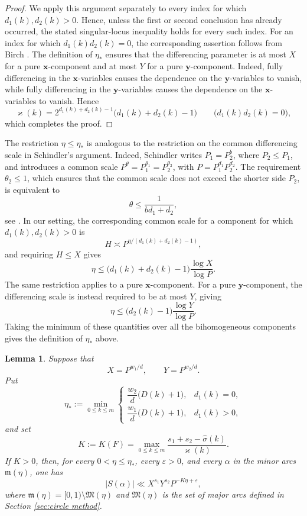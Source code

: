 \documentclass[12pt,reqno]{amsart}
\newtheorem{lemma}[theorem]{Lemma}
\theoremstyle{definition}
\theoremstyle{remark}
\numberwithin{equation}{section}
\def\bfx{{\mathbf x}}
\def\bfy{{\mathbf y}}
\def\grm{{\mathfrak m}}\def\grM{{\mathfrak M}}
\def\a{{\alpha}} \def\bfalp{{\boldsymbol \alpha}} \def\atil{{\widetilde \alpha}}
\def\eps{\varepsilon}
\begin{document}
\begin{proof}
    We apply this argument separately to every index for which
    $d_1(k),d_2(k)>0$. Hence, unless the first or second conclusion has
    already occurred, the stated singular-locus inequality holds for every
    such index. For an index for which $d_1(k)d_2(k)=0$, the corresponding
    assertion follows from Birch \cite[Lemma 2.5]{Birch1962}.  The
    definition of $\eta_*$ ensures that the differencing parameter is at
    most $X$ for a pure $\bfx$-component and at most $Y$ for a pure
    $\bfy$-component.
    Indeed, fully differencing in the $\bfx$-variables causes the
    dependence on the $\bfy$-variables to vanish, while fully
    differencing in the $\bfy$-variables causes the dependence on the
    $\bfx$-variables to vanish. Hence
    \[
        \varkappa(k)
        =2^{d_1(k)+d_2(k)-1}
        \bigl(d_1(k)+d_2(k)-1\bigr)
        \qquad\bigl(d_1(k)d_2(k)=0\bigr),
    \]
    which completes the proof.
\end{proof}

The restriction $\eta\leq\eta_*$ is analogous to the restriction on the
common differencing scale in Schindler's argument.  Indeed, Schindler writes
$P_1=P_2^b$, where $P_2\leq P_1$, and introduces a common scale
$P^\theta=P_1^{\theta_1}=P_2^{\theta_2}$, with
$P=P_1^{d_1}P_2^{d_2}$.  The requirement $\theta_2\leq1$, which ensures
that the common scale does not exceed the shorter side $P_2$, is equivalent
to
\[
    \theta\leq\frac{1}{bd_1+d_2},
\]
see \cite[Lemma 4.3]{Schindler2014}.  In our setting, the corresponding
common scale for a component for which $d_1(k),d_2(k)>0$ is
\[
    H\asymp P^{\eta/(d_1(k)+d_2(k)-1)},
\]
and requiring $H\leq X$ gives
\[
    \eta\leq
    \bigl(d_1(k)+d_2(k)-1\bigr)\frac{\log X}{\log P}.
\]
The same restriction applies to a pure $\bfx$-component.  For a pure
$\bfy$-component, the differencing scale is instead required to be at most
$Y$, giving
\[
    \eta\leq
    \bigl(d_2(k)-1\bigr)\frac{\log Y}{\log P}.
\]
Taking the minimum of these quantities over all the bihomogeneous
components gives the definition of $\eta_*$ above.

\begin{lemma}\label{lemma:hat sigma pointwise minor arc bound}
    Suppose that
    \[
        X=P^{w_1/d},
        \qquad
        Y=P^{w_2/d}.
    \]
    Put
    \[
        \eta_*
        :=\min_{0\leq k\leq m}
        \begin{cases}
        \dfrac{w_2}{d}\bigl(D(k)+1\bigr),&d_1(k)=0,\\[3mm]
        \dfrac{w_1}{d}\bigl(D(k)+1\bigr),&d_1(k)>0,
        \end{cases}
    \]
    and set
    \[
        K:=K(F)=\max_{0\leq k\leq m}
        \frac{s_1+s_2-\widehat{\sigma}(k)}{\varkappa(k)}.
    \]
    If $K>0$, then, for every $0<\eta\leq\eta_*$, every $\eps>0$, and
    every $\a$ in the minor arcs $\grm(\eta)$, one has
    \begin{equation}\label{eqs: pointwise minor arc bound}
        |S(\a)|
        \ll X^{s_1}Y^{s_2}P^{-K\eta+\eps},
    \end{equation}
    where $\grm(\eta)=[0,1)\setminus\grM(\eta)$ and $\grM(\eta)$ is the
    set of major arcs defined in Section \ref{sec:circle method}.
\end{lemma}
\end{document}
